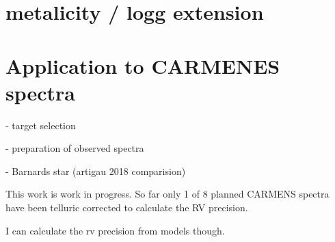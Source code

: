 \section{ metalicity / logg extension}



\section{Application to CARMENES spectra}

- target selection

- preparation of observed spectra

- Barnards star (artigau 2018 comparision)


This work is work in progress. So far only 1 of 8 planned CARMENS spectra have been telluric corrected to calculate the RV precision.

{I can calculate the rv precision from models though.}